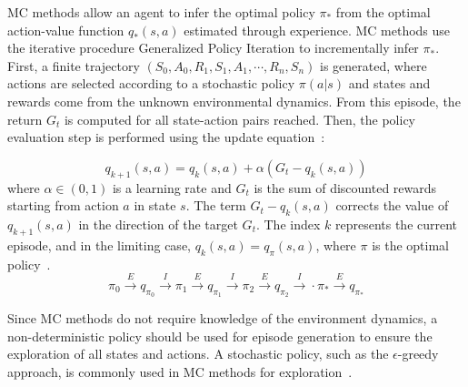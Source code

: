 \documentclass[../xlapes02]{subfiles}
\begin{document}
    MC methods allow an agent to infer the optimal policy $\pi_*$ from the optimal action-value function $q_*(s,a)$ estimated through experience. MC methods use the iterative procedure Generalized Policy Iteration to incrementally infer $\pi_*$. First, a finite trajectory $(S_0,A_0,R_1,S_1,A_1,\cdots,R_n,S_n)$ is generated, where actions are selected according to a stochastic policy $\pi(a|s)$ and states and rewards come from the unknown environmental dynamics. From this episode, the return $G_t$ is computed for all state-action pairs reached. Then, the policy evaluation step is performed using the update equation~\cite{sutton2018reinforcement, FITMT25127, rao2022foundations}:


    \begin{equation}
        \label{eq:mc}
        q_{k+1}(s,a)=q_k(s,a)+\alpha(G_t-q_k(s,a))
    \end{equation}
    where $\alpha \in (0,1)$ is a learning rate and $G_t$ is the sum of discounted rewards starting from action $a$ in state $s$. The term $G_t - q_k(s, a)$ corrects the value of $q_{k+1}(s,a)$ in the direction of the target $G_t$. The index $k$ represents the current episode, and in the limiting case, $q_k(s,a) = q_{\pi}(s,a)$, where $\pi$ is the optimal policy~\cite{sutton2018reinforcement}.
    \begin{equation}
        \pi_0\xrightarrow{E}q_{\pi_0}\xrightarrow{I}
        \pi_1\xrightarrow{E}q_{\pi_1}\xrightarrow{I}
        \pi_2\xrightarrow{E}q_{\pi_2}\xrightarrow{I}
        \cdot
        \pi_*\xrightarrow{E}q_{\pi_*}
    \end{equation}

    Since MC methods do not require knowledge of the environment dynamics, a non-deterministic policy should be used for episode generation to ensure the exploration of all states and actions. A stochastic policy, such as the $\epsilon$-greedy approach, is commonly used in MC methods for exploration~\cite{FITMT25127}.
\end{document}
